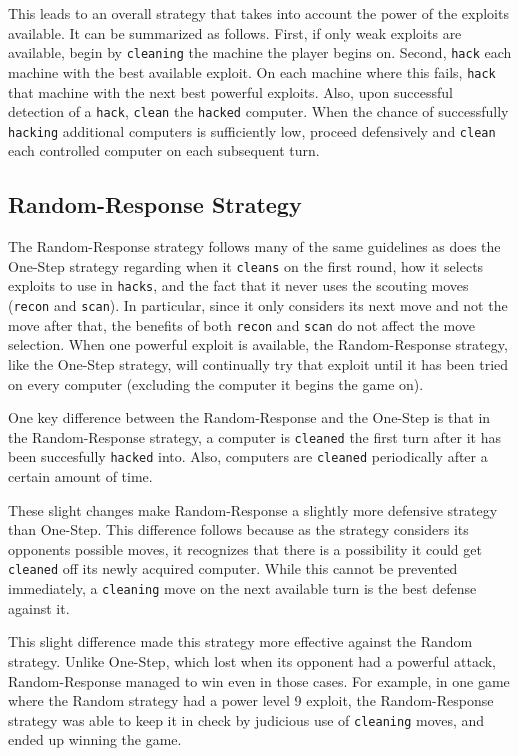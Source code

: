 \documentclass{sig-alternate}
\begin{document}
This leads to an overall strategy that takes into account the power of the exploits available. 
It can be summarized as follows. 
First, if only weak exploits are available, begin by {\tt cleaning} the machine the player begins on.  
Second, {\tt hack} each machine with the best available exploit. 
On each machine where this fails, {\tt hack} that machine with the next best powerful exploits. 
Also, upon successful detection of a {\tt hack}, {\tt clean} the {\tt hacked} computer.
When the chance of successfully {\tt hacking} additional computers is sufficiently low, proceed defensively and {\tt clean} each controlled computer on each subsequent turn.




\subsection{Random-Response Strategy}
The Random-Response strategy follows many of the same guidelines as does the One-Step strategy regarding when it {\tt cleans} on the first round, how it selects exploits to use in {\tt hacks}, and the fact that it never uses the scouting moves ({\tt recon} and {\tt scan}).
In particular, since it only considers its next move and not the move after that, the benefits of both {\tt recon} and {\tt scan} do not affect the move selection.
When one powerful exploit is available, the Random-Response strategy, like the One-Step strategy, will continually try that exploit until it has been tried on every computer (excluding the computer it begins the game on). 

One key difference between the Random-Response and the One-Step is that in the Random-Response strategy, a computer is {\tt cleaned} the first turn after it has been succesfully {\tt hacked} into. 
Also, computers are {\tt cleaned} periodically after a certain amount of time. 

These slight changes make Random-Response a slightly more defensive strategy than One-Step.
This difference follows because as the strategy considers its opponents possible moves, it recognizes that there is a possibility it could get {\tt cleaned} off its newly acquired computer.
While this cannot be prevented immediately, a {\tt cleaning} move on the next available turn is the best defense against it.

This slight difference made this strategy more effective against the Random strategy.
Unlike One-Step, which lost when its opponent had a powerful attack, Random-Response managed to win even in those cases.
For example, in one game where the Random strategy had a power level 9 exploit, the Random-Response strategy was able to keep it in check by judicious use of {\tt cleaning} moves, and ended up winning the game.
\end{document}
